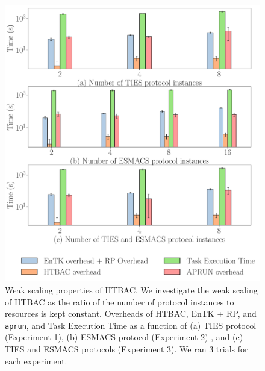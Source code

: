 





\begin{figure}
  \centering
    \includegraphics[width=\columnwidth]{figures/ws_all.pdf}
    \caption{Weak scaling properties of HTBAC. We
    investigate the weak scaling of HTBAC as the ratio of the number of
    protocol instances to resources is kept constant. Overheads of HTBAC, 
    EnTK + RP, and \texttt{aprun}, and Task Execution Time as a function of (a)
    TIES protocol (Experiment 1), (b) ESMACS protocol (Experiment 2) , and (c) 
    TIES and ESMACS protocols (Experiment 3). We ran 3 trials for each 
    experiment.} 
\label{fig:ws}
\end{figure}

